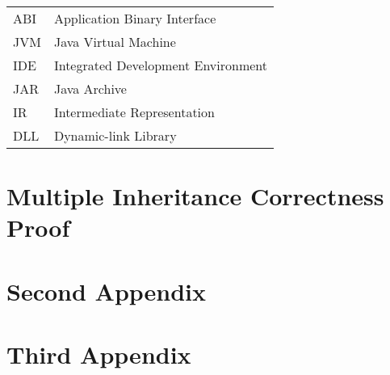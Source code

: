\documentclass[inscr,ack,preface]{diphdthesis}
\begin{document}

\backmatter


\abbreviations
\begin{center}
	\renewcommand{\arraystretch}{1.5}
	\begin{longtable}{ l @{\qquad} l }
      \toprule
      ABI    & Application Binary Interface \\
      JVM    & Java Virtual Machine \\
      IDE    & Integrated Development Environment \\
      JAR    & Java Archive \\
      IR     & Intermediate Representation \\
      DLL    & Dynamic-link Library \\
      \bottomrule
	\end{longtable}
\end{center}



\begin{appendix}
\appendixstartedtrue

{}

\chapter{Multiple Inheritance Correctness Proof}


\chapter{Second Appendix}
\chapter{Third Appendix}
\end{appendix}



\printbibliography[title={References}]
\end{document}
